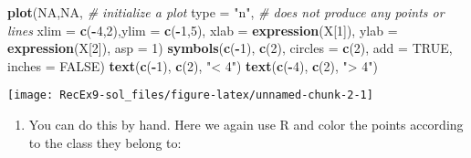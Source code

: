 \documentclass[]{article}
\newenvironment{Shaded}{\begin{snugshade}}{\end{snugshade}}
\newcommand{\CommentTok}[1]{\textcolor[rgb]{0.56,0.35,0.01}{\textit{#1}}}
\newcommand{\DataTypeTok}[1]{\textcolor[rgb]{0.13,0.29,0.53}{#1}}
\newcommand{\DecValTok}[1]{\textcolor[rgb]{0.00,0.00,0.81}{#1}}
\newcommand{\KeywordTok}[1]{\textcolor[rgb]{0.13,0.29,0.53}{\textbf{#1}}}
\newcommand{\NormalTok}[1]{#1}
\newcommand{\OperatorTok}[1]{\textcolor[rgb]{0.81,0.36,0.00}{\textbf{#1}}}
\newcommand{\OtherTok}[1]{\textcolor[rgb]{0.56,0.35,0.01}{#1}}
\newcommand{\StringTok}[1]{\textcolor[rgb]{0.31,0.60,0.02}{#1}}
\providecommand{\tightlist}{%
  \setlength{\itemsep}{0pt}\setlength{\parskip}{0pt}}
\begin{document}
\begin{Shaded}
\begin{Highlighting}[]
\KeywordTok{plot}\NormalTok{(}\OtherTok{NA}\NormalTok{,}\OtherTok{NA}\NormalTok{, }\CommentTok{# initialize a plot}
     \DataTypeTok{type =} \StringTok{"n"}\NormalTok{, }\CommentTok{# does not produce any points or lines}
     \DataTypeTok{xlim =} \KeywordTok{c}\NormalTok{(}\OperatorTok{-}\DecValTok{4}\NormalTok{,}\DecValTok{2}\NormalTok{),}\DataTypeTok{ylim =} \KeywordTok{c}\NormalTok{(}\OperatorTok{-}\DecValTok{1}\NormalTok{,}\DecValTok{5}\NormalTok{), }\DataTypeTok{xlab =} \KeywordTok{expression}\NormalTok{(X[}\DecValTok{1}\NormalTok{]), }\DataTypeTok{ylab =} \KeywordTok{expression}\NormalTok{(X[}\DecValTok{2}\NormalTok{]),}
     \DataTypeTok{asp =} \DecValTok{1}\NormalTok{)}
\KeywordTok{symbols}\NormalTok{(}\KeywordTok{c}\NormalTok{(}\OperatorTok{-}\DecValTok{1}\NormalTok{), }\KeywordTok{c}\NormalTok{(}\DecValTok{2}\NormalTok{), }\DataTypeTok{circles =} \KeywordTok{c}\NormalTok{(}\DecValTok{2}\NormalTok{), }\DataTypeTok{add =} \OtherTok{TRUE}\NormalTok{, }\DataTypeTok{inches =} \OtherTok{FALSE}\NormalTok{)}
\KeywordTok{text}\NormalTok{(}\KeywordTok{c}\NormalTok{(}\OperatorTok{-}\DecValTok{1}\NormalTok{), }\KeywordTok{c}\NormalTok{(}\DecValTok{2}\NormalTok{), }\StringTok{"< 4"}\NormalTok{)}
\KeywordTok{text}\NormalTok{(}\KeywordTok{c}\NormalTok{(}\OperatorTok{-}\DecValTok{4}\NormalTok{), }\KeywordTok{c}\NormalTok{(}\DecValTok{2}\NormalTok{), }\StringTok{"> 4"}\NormalTok{)}
\end{Highlighting}
\end{Shaded}

\texttt{[image: RecEx9-sol\_files/figure-latex/unnamed-chunk-2-1]}

\begin{enumerate}
\def\labelenumi{\alph{enumi})}
\setcounter{enumi}{2}
\tightlist
\item
  You can do this by hand. Here we again use R and color the points
  according to the class they belong to:
\end{enumerate}
\end{document}
